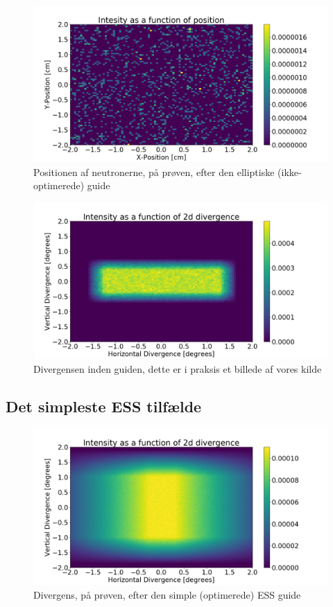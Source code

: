 \documentclass[12pt,oneside,a4paper]{article}
\begin{document}
{{{{{\begin{figure}[H]
\centering
\includegraphics[width=1\textwidth]{psd_ellipse_after.png}
\caption{Positionen af neutronerne, på prøven, efter den elliptiske  (ikke-optimerede) guide}
\end{figure}

\begin{figure}[H]
\centering
\includegraphics[width=1\textwidth]{div_straight_before.png}
\caption{Divergensen inden guiden, dette er i praksis et billede af vores kilde}
\end{figure}

\newpage
\subsection{Det simpleste ESS tilfælde}

\begin{figure}[H]
\centering
\includegraphics[width=1\textwidth]{div_ess_simple_after.png}
\caption{Divergens, på prøven, efter den simple (optimerede) ESS guide}
\end{figure}


}}}}}
\end{document}
